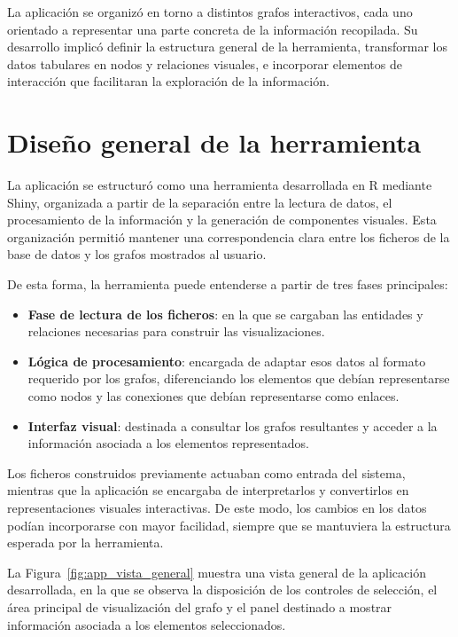 \documentclass[11pt,spanish,listoffigures,listoftables]{tfgetsinf}
\begin{document}
La aplicación se organizó en torno a distintos grafos interactivos, cada uno orientado a representar una parte concreta de la información recopilada. Su desarrollo implicó definir la estructura general de la herramienta, transformar los datos tabulares en nodos y relaciones visuales, e incorporar elementos de interacción que facilitaran la exploración de la información.

\section{Diseño general de la herramienta}

La aplicación se estructuró como una herramienta desarrollada en R mediante Shiny, organizada a partir de la separación entre la lectura de datos, el procesamiento de la información y la generación de componentes visuales. Esta organización permitió mantener una correspondencia clara entre los ficheros de la base de datos y los grafos mostrados al usuario.

De esta forma, la herramienta puede entenderse a partir de tres fases principales:

\begin{itemize}
    \item \textbf{Fase de lectura de los ficheros}: en la que se cargaban las entidades y relaciones necesarias para construir las visualizaciones.

    \item \textbf{Lógica de procesamiento}: encargada de adaptar esos datos al formato requerido por los grafos, diferenciando los elementos que debían representarse como nodos y las conexiones que debían representarse como enlaces.

    \item \textbf{Interfaz visual}: destinada a consultar los grafos resultantes y acceder a la información asociada a los elementos representados.
\end{itemize}

Los ficheros construidos previamente actuaban como entrada del sistema, mientras que la aplicación se encargaba de interpretarlos y convertirlos en representaciones visuales interactivas. De este modo, los cambios en los datos podían incorporarse con mayor facilidad, siempre que se mantuviera la estructura esperada por la herramienta.

La Figura~\ref{fig:app_vista_general} muestra una vista general de la aplicación desarrollada, en la que se observa la disposición de los controles de selección, el área principal de visualización del grafo y el panel destinado a mostrar información asociada a los elementos seleccionados.
\end{document}
